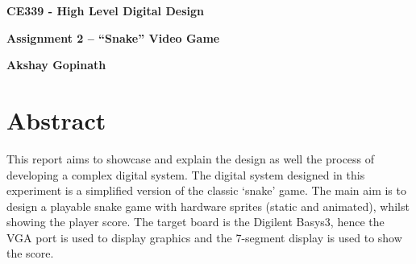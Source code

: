 \documentclass[aps, secnumarabic, balancelastpage, asmath, amssymb, nofootinbib, floatfix,]{revtex4-2}
\begin{document}


\thispagestyle{plain}
\begin{center}
    \Large
    \textbf{CE339 - High Level Digital Design}
        
    \vspace{0.4cm}
    \large
    \textbf{Assignment 2 -- ``Snake'' Video Game}
        
    \vspace{0.4cm}
    \textbf{Akshay Gopinath}
       
    \section*{Abstract}
    \fontsize{11pt}{12pt}\selectfont
    
\end{center}
\fontsize{11pt}{12pt}\selectfont
{
\setlength{\parindent}{0pt}


This report aims to showcase and explain the design as well the process of developing a complex digital system. The digital system designed in this experiment is a simplified version of the classic `snake' game. The main aim is to design a playable snake game with hardware sprites (static and animated), whilst showing the player score. The target board is the Digilent Basys3, hence the VGA port is used to display graphics and the 7-segment display is used to show the score.

}

\clearpage
\end{document}
